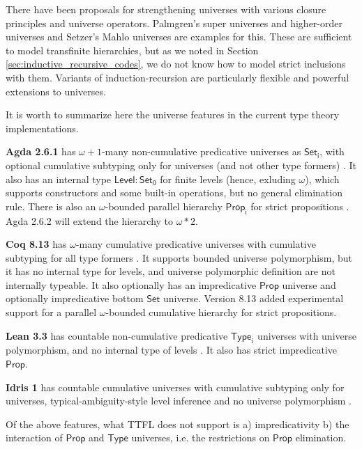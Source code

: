 \documentclass[a4paper,UKenglish,cleveref, autoref, thm-restate]{lipics-v2021}
\theoremstyle{remark}
\theoremstyle{definition}
\newcommand{\Set}[1]{\mathsf{Set_{#1}}}
\newcommand{\Seti}{\mathsf{Set}}
\newcommand{\msf}[1]{\mathsf{#1}}
\begin{document}
There have been proposals for strengthening universes with various closure
principles and universe operators. Palmgren's super universes and higher-order
universes \cite{Palmgren98onuniverses} and Setzer's Mahlo universes
\cite{setzer00mahlo} are examples for this. These are sufficient to model
transfinite hierarchies, but as we noted in Section
\ref{sec:inductive_recursive_codes}, we do not know how to model strict
inclusions with them. Variants of induction-recursion \cite{dybjer99finite,
  indexedir, positiveir} are particularly flexible and powerful extensions to
universes.

It is worth to summarize here the universe features in the current
type theory implementations.

\textbf{Agda 2.6.1} has $\omega+1$-many non-cumulative predicative universes as
$\Set{i}$, with optional cumulative subtyping only for universes (and not other
type formers) \cite{agdadocs}.  It also has an internal type $\msf{Level} : \Set0$ for finite
levels (hence, exluding $\omega$), which supports constructors and some built-in
operations, but no general elimination rule. There is also an $\omega$-bounded
parallel hierarchy $\msf{Prop_i}$ for strict propositions \cite{sprop}. Agda
2.6.2 will extend the hierarchy to $\omega * 2$.

\textbf{Coq 8.13} has $\omega$-many cumulative predicative universes with
cumulative subtyping for all type formers \cite{timany18cumulative}. It supports
bounded universe polymorphism, but it has no internal type for levels, and
universe polymorphic definition are not internally typeable. It also optionally
has an impredicative $\msf{Prop}$ universe and optionally impredicative bottom
$\Seti$ universe. Version 8.13 added experimental support for a parallel
$\omega$-bounded cumulative hierarchy for strict propositions.

\textbf{Lean 3.3} has countable non-cumulative predicative $\msf{Type}_i$
universes with universe polymorphism, and no internal type of levels
\cite{leanmanual}. It also has strict impredicative $\msf{Prop}$.

\textbf{Idris 1} has countable cumulative universes with cumulative subtyping
only for universes, typical-ambiguity-style level inference and no universe
polymorphism \cite{idrisdocs}.

Of the above features, what TTFL does not support is a) impredicativity b) the
interaction of $\msf{Prop}$ and $\msf{Type}$ universes, i.e. the restrictions on
$\msf{Prop}$ elimination.
\end{document}
